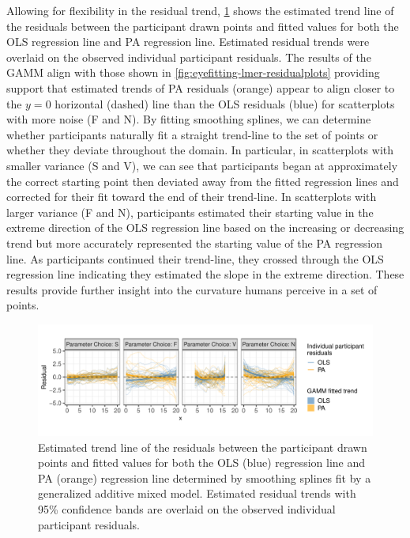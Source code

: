 \documentclass[12pt]{article}
\begin{document}
Allowing for flexibility in the residual trend,
\cref{fig:eyefitting-gamm-residualplots} shows the estimated trend line
of the residuals between the participant drawn points and fitted values
for both the OLS regression line and PA regression line. Estimated
residual trends were overlaid on the observed individual participant
residuals. The results of the GAMM align with those shown in
\cref{fig:eyefitting-lmer-residualplots} providing support that
estimated trends of PA residuals (orange) appear to align closer to the
\(y=0\) horizontal (dashed) line than the OLS residuals (blue) for
scatterplots with more noise (F and N). By fitting smoothing splines, we
can determine whether participants naturally fit a straight trend-line
to the set of points or whether they deviate throughout the domain. In
particular, in scatterplots with smaller variance (S and V), we can see
that participants began at approximately the correct starting point then
deviated away from the fitted regression lines and corrected for their
fit toward the end of their trend-line. In scatterplots with larger
variance (F and N), participants estimated their starting value in the
extreme direction of the OLS regression line based on the increasing or
decreasing trend but more accurately represented the starting value of
the PA regression line. As participants continued their trend-line, they
crossed through the OLS regression line indicating they estimated the
slope in the extreme direction. These results provide further insight
into the curvature humans perceive in a set of points.

\begin{figure}[tbp]

{\centering \includegraphics[width=1\linewidth,]{Eye-Fitting-Straight-Lines-in-the-Modern-Era_files/figure-latex/eyefitting-gamm-residualplots-1} 

}

\caption{Estimated trend line of the residuals between the participant drawn points and fitted values for both the OLS (blue) regression line and PA (orange) regression line determined by smoothing splines fit by a generalized additive mixed model. Estimated residual trends with 95\% confidence bands are overlaid on the observed individual participant residuals.}\label{fig:eyefitting-gamm-residualplots}
\end{figure}
\end{document}
